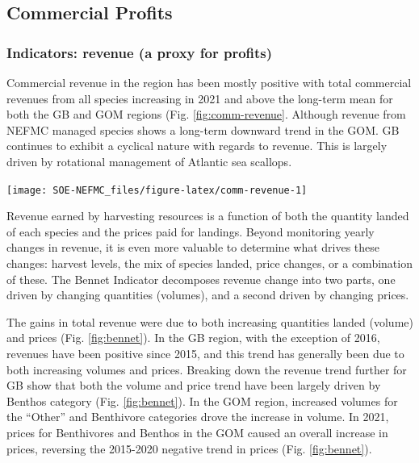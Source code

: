 \documentclass[
  10pt,
]{article}
\let\origfigure\figure
\let\endorigfigure\endfigure
\renewenvironment{figure}[1][2] {
    \expandafter\origfigure\expandafter[H]
} {
    \endorigfigure
}
\begin{document}
\hypertarget{commercial-profits}{%
\subsection{Commercial Profits}\label{commercial-profits}}

\hypertarget{indicators-revenue-a-proxy-for-profits}{%
\subsubsection{Indicators: revenue (a proxy for profits)}\label{indicators-revenue-a-proxy-for-profits}}

Commercial revenue in the region has been mostly positive with total commercial revenues from all species increasing in 2021 and above the long-term mean for both the GB and GOM regions (Fig. \ref{fig:comm-revenue}. Although revenue from NEFMC managed species shows a long-term downward trend in the GOM. GB continues to exhibit a cyclical nature with regards to revenue. This is largely driven by rotational management of Atlantic sea scallops.

\begin{figure}

{\centering \texttt{[image: SOE-NEFMC\_files/figure-latex/comm-revenue-1]} 

}

\caption{Revenue through 2022 for the New England region: total (black) and from NEFMC managed species (red).}\label{fig:comm-revenue}
\end{figure}

Revenue earned by harvesting resources is a function of both the quantity landed of each species and the prices paid for landings. Beyond monitoring yearly changes in revenue, it is even more valuable to determine what drives these changes: harvest levels, the mix of species landed, price changes, or a combination of these. The Bennet Indicator decomposes revenue change into two parts, one driven by changing quantities (volumes), and a second driven by changing prices.

The gains in total revenue were due to both increasing quantities landed (volume) and prices (Fig. \ref{fig:bennet}). In the GB region, with the exception of 2016, revenues have been positive since 2015, and this trend has generally been due to both increasing volumes and prices. Breaking down the revenue trend further for GB show that both the volume and price trend have been largely driven by Benthos category (Fig. \ref{fig:bennet}). In the GOM region, increased volumes for the ``Other'' and Benthivore categories drove the increase in volume. In 2021, prices for Benthivores and Benthos in the GOM caused an overall increase in prices, reversing the 2015-2020 negative trend in prices (Fig. \ref{fig:bennet}).
\end{document}
